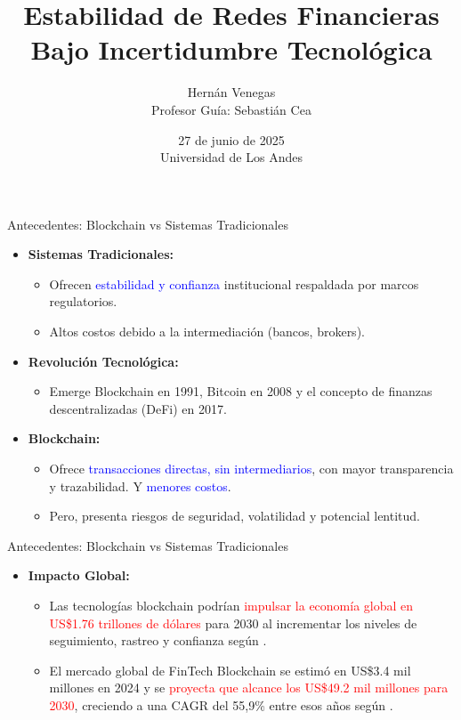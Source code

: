 \documentclass{beamer}
\title{Estabilidad de Redes Financieras Bajo Incertidumbre Tecnológica}
\author{Hernán Venegas \\ Profesor Guía: Sebastián Cea}
\date{27 de junio de 2025 \\ Universidad de Los Andes}
\begin{document}
\frame{\titlepage}

\begin{frame}{Antecedentes: Blockchain vs Sistemas Tradicionales}
\begin{itemize}
    \item \textbf{Sistemas Tradicionales:}
    \begin{itemize}
        \item Ofrecen \textcolor{blue}{estabilidad y confianza} institucional respaldada por marcos regulatorios.
        \item Altos costos debido a la intermediación (bancos, brokers).
    \end{itemize}
    
    \item \textbf{Revolución Tecnológica:}
    \begin{itemize}
        \item Emerge Blockchain en 1991, Bitcoin en 2008 y el concepto de finanzas descentralizadas (DeFi) en 2017.
    \end{itemize}
    
    
    
    \item \textbf{Blockchain:}
    \begin{itemize}
        \item Ofrece \textcolor{blue}{transacciones directas, sin intermediarios}, con mayor transparencia y trazabilidad. Y \textcolor{blue}{menores costos}.
        \item Pero, presenta riesgos de seguridad, volatilidad y potencial lentitud.
    \end{itemize}
\end{itemize}
\end{frame}

    \begin{frame}{Antecedentes: Blockchain vs Sistemas Tradicionales}
\begin{itemize}
    \item \textbf{Impacto Global:}
    \begin{itemize}
        \item Las tecnologías blockchain podrían \textcolor{red}{impulsar la economía global en US\$1.76 trillones de dólares} para 2030 al incrementar los niveles de seguimiento, rastreo y confianza según .
        \item El mercado global de FinTech Blockchain se estimó en US\$3.4 mil millones en 2024 y se \textcolor{red}{proyecta que alcance los US\$49.2 mil millones para 2030}, creciendo a una CAGR del 55,9\% entre esos años  según .
    \end{itemize}
\end{itemize}
\end{frame}
\end{document}

